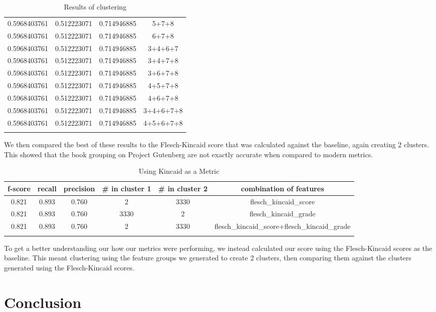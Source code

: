 \documentclass[]{article}
\begin{document}
\begin{longtable}{| c | c | c | c |}
		0.5968403761 & 0.512223071 & 0.714946885 & 5+7+8 \\
		0.5968403761 & 0.512223071 & 0.714946885 & 6+7+8 \\
		0.5968403761 & 0.512223071 & 0.714946885 & 3+4+6+7 \\
		0.5968403761 & 0.512223071 & 0.714946885 & 3+4+7+8 \\
		0.5968403761 & 0.512223071 & 0.714946885 & 3+6+7+8 \\
		0.5968403761 & 0.512223071 & 0.714946885 & 4+5+7+8 \\
		0.5968403761 & 0.512223071 & 0.714946885 & 4+6+7+8 \\
		0.5968403761 & 0.512223071 & 0.714946885 & 3+4+6+7+8 \\
		0.5968403761 & 0.512223071 & 0.714946885 & 4+5+6+7+8 \\
		\hline
	\caption{Results of clustering}
	\label{table:features2}
\end{longtable}

We then compared the best of these results to the Flesch-Kincaid score that was calculated against the baseline, again creating 2 clusters.
This showed that the book grouping on Project Gutenberg are not exactly accurate when compared to modern metrics.

\begin{longtable}{| c | c | c | c | c | c |} \hline
	f-score & recall & precision & \# in cluster 1 & \# in cluster 2 & combination of features \\
	\hline
0.821 & 0.893 & 0.760 & 2 & 3330 & flesch\_kincaid\_score \\
0.821 & 0.893 & 0.760 & 3330 & 2 & flesch\_kincaid\_grade \\
0.821 & 0.893 & 0.760 & 2 & 3330 & flesch\_kincaid\_score+flesch\_kincaid\_grade \\
\hline
	\caption{Using Kincaid as a Metric}
	\label{table:kincaid_clustering}
\end{longtable}

To get a better understanding our how our metrics were performing, we instead calculated our score using the Flesch-Kincaid scores as the baseline.
This meant clustering using the feature groups we generated to create 2 clusters, then comparing them against the clusters generated using the Flesch-Kincaid scores.



\section{Conclusion}
\end{document}
